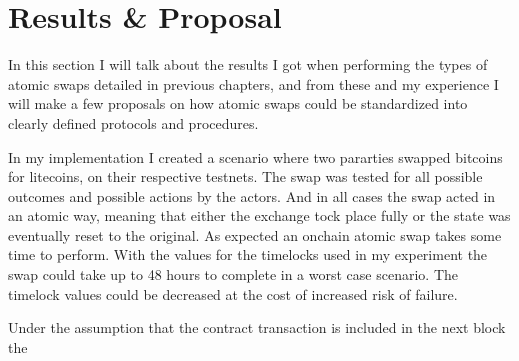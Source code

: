 \chapter{Results \& Proposal}
In this section I will talk about the results I got when performing the types of atomic swaps detailed in previous chapters, and from these and my experience I will make a few proposals on how atomic swaps could  be standardized into clearly defined protocols and procedures. 

In my implementation I created a scenario where two pararties swapped bitcoins for litecoins, on their respective testnets. 
The swap was tested for all possible outcomes and possible actions by the actors. And in all cases the swap acted in an atomic way, meaning that either the exchange tock place fully or the state was eventually reset to the original. 
As expected an onchain atomic swap takes some time to perform. With the values for the timelocks used in my experiment the swap could take up to 48 hours to complete in a worst case scenario. The timelock values could be decreased at the cost of increased risk of failure. 

Under the assumption that the contract transaction is included in the next block the

